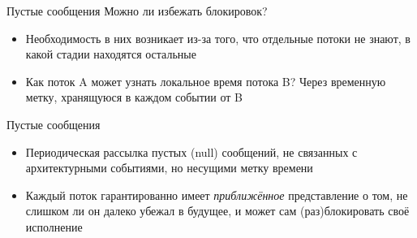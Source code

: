 \documentclass{beamer}
\begin{document}
\begin{frame}{Пустые сообщения}
Можно ли избежать блокировок?

\begin{itemize}
    \item Необходимость в них возникает из-за того, что отдельные потоки не знают, в какой стадии находятся остальные
    \item Как поток A может узнать локальное время потока B? Через временную метку, хранящуюся в каждом событии от B
\end{itemize}

\end{frame}

\begin{frame}{Пустые сообщения}
\begin{itemize}
    \item Периодическая рассылка пустых (null) сообщений, не связанных с архитектурными событиями, но несущими метку времени
    \item Каждый поток гарантированно имеет \textit{приближённое} представление о том, не слишком ли он далеко убежал в будущее, и может сам (раз)блокировать своё исполнение
\end{itemize}

\end{frame}
\end{document}
